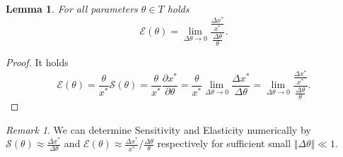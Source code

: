 \documentclass[a4paper, english, 11pt, onecolumn, oneside, final]{article}
\numberwithin{equation}{section}   %
\theoremstyle{plain}
\newtheorem{lemma}      [theorem]{Lemma}
\theoremstyle{definition}
\theoremstyle{remark}
\newtheorem{remark}     [theorem]{Remark}
\begin{document}
\begin{lemma}
For all parameters $\theta\in T$ holds
    \begin{equation*}
        \mathcal{E}(\theta) = \lim_{\Delta\theta\to 0}\frac{\frac{\Delta x^*}{x^*}}{\frac{\Delta\theta}{\theta}}.
    \end{equation*}
\end{lemma}
\begin{proof}
    It holds
    \begin{equation*}
        \mathcal{E}(\theta)
        = \frac{\theta}{x^*}\mathcal{S}(\theta)
        = \frac{\theta}{x^*}\frac{\partial x^*}{\partial\theta}
        = \frac{\theta}{x^*}\lim_{\Delta\theta\to 0}\frac{\Delta x^*}{\Delta\theta}
        = \lim_{\Delta\theta\to 0}\frac{\frac{\Delta x^*}{x^*}}{\frac{\Delta\theta}{\theta}}.
    \end{equation*}
\end{proof}
\begin{remark}
    We can determine Sensitivity and Elasticity numerically by $\mathcal{S}(\theta) \approx \frac{\Delta x^*}{\Delta\theta}$ and $\mathcal{E}(\theta) \approx \frac{\Delta x^*}{x^*}/\frac{\Delta\theta}{\theta}$ respectively for sufficient small $\Vert\Delta\theta\Vert\ll 1$.
\end{remark}
\end{document}
